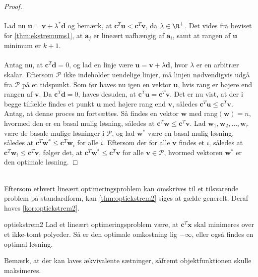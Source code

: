 \begin{proof}
\\\\%
Lad nu $\textbf{u} = \textbf{v} + \lambda^* \textbf{d} $ og bemærk, at $ \textbf{c}^T \textbf{u} < \textbf{c}^T \textbf{v}$, da $ \lambda \in \R^+ $. 
Det vides fra beviset for \ref{thm:ekstremums1}, at $\textbf{a}_j$ er lineært uafhængig af $\textbf{a}_i$, samt at rangen af $\textbf{u}$ minimum er $k + 1$. 
\\\\
%
Antag nu, at $\textbf{c}^T \textbf{d} = 0$, og lad en linje være $\textbf{u} = \textbf{v} + \lambda \textbf{d}$, hvor $ \lambda $ er en arbitrær skalar. 
Eftersom $\mathcal{P}$ ikke indeholder uendelige linjer, må linjen nødvendigvis udgå fra $\mathcal{P}$ på et tidspunkt. 
Som før haves nu igen en vektor $\textbf{u}$, hvis rang er højere end rangen af $\textbf{v}$. 
Da $\textbf{c}^T \textbf{d} = 0$, haves desuden, at $\textbf{c}^T \textbf{u} = \textbf{c}^T \textbf{v}$. 
Det er nu vist, at der i begge tilfælde findes et punkt $\textbf{u}$ med højere rang end $\textbf{v}$, således $\textbf{c}^T \textbf{u} \leq \textbf{c}^T \textbf{v}$. 
Antag, at denne proces nu fortsættes.
Så findes en vektor $\textbf{w}$ med rang$(\textbf{w})=n$, hvormed den er en basal mulig løsning, således at $\textbf{c}^T \textbf{w} \leq \textbf{c}^T \textbf{v}$. 
Lad $\textbf{w}_1, \textbf{w}_2, \ldots , \textbf{w}_r$ være de basale mulige løsninger i $\mathcal{P}$, og lad $\textbf{w}^*$ være en basal mulig løsning, således at $\textbf{c}^T \textbf{w}^* \leq \textbf{c}^T \textbf{w}_i$ for alle $i$. 
Eftersom der for alle $\textbf{v}$ findes et $i$, således at $\textbf{c}^T \textbf{w}_i \leq \textbf{c}^T \textbf{v}$, følger det, at $\textbf{c}^T \textbf{w}^* \leq \textbf{c}^T \textbf{v}$ for alle $\textbf{v} \in \mathcal{P}$, hvormed vektoren $\textbf{w}^*$ er den optimale løsning. 
\end{proof}
\\
%
Eftersom ethvert lineært optimeringsproblem kan omskrives til et tilsvarende problem på standardform, kan \ref{thm:optiekstrem2} siges at gælde generelt. 
Deraf haves \ref{kor:optiekstrem2}. 
%
\begin{kor}{}{optiekstrem2}
Lad et lineært optimeringsproblem være, at $\textbf{c}^T \textbf{x}$ skal minimeres over et ikke-tomt polyeder.
Så er den optimale omkostning lig $- \infty$, eller også findes en optimal løsning. 
\end{kor}
\noindent
%
Bemærk, at der kan laves ækvivalente sætninger, såfremt objektfunktionen skulle maksimeres.